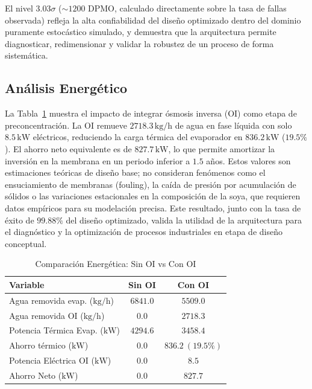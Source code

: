 \documentclass[10pt,letterpaper,twocolumn]{article}
\begin{document}
El nivel $3.03\sigma$ ($\sim1200$ DPMO, calculado directamente sobre la tasa de fallas observada) refleja la alta confiabilidad del diseño optimizado dentro del dominio puramente estocástico simulado, y demuestra que la arquitectura permite diagnosticar, redimensionar y validar la robustez de un proceso de forma sistemática.

\subsection{Análisis Energético}

La Tabla~\ref{tab:energy_comparison} muestra el impacto de integrar ósmosis inversa (OI) como etapa de preconcentración. La OI remueve $2718.3\,\text{kg/h}$ de agua en fase líquida con solo $8.5\,\text{kW}$ eléctricos, reduciendo la carga térmica del evaporador en $836.2\,\text{kW}$ ($19.5\%$). El ahorro neto equivalente es de $827.7\,\text{kW}$, lo que permite amortizar la inversión en la membrana en un periodo inferior a $1.5$ años. Estos valores son estimaciones teóricas de diseño base; no consideran fenómenos como el ensuciamiento de membranas (fouling), la caída de presión por acumulación de sólidos o las variaciones estacionales en la composición de la soya, que requieren datos empíricos para su modelación precisa. Este resultado, junto con la tasa de éxito de $99.88\%$ del dise\~no optimizado, valida la utilidad de la arquitectura para el diagn\'ostico y la optimizaci\'on de procesos industriales en etapa de diseño conceptual.

\begin{table}[t]
\centering
\caption{Comparación Energética: Sin OI vs Con OI}
\label{tab:energy_comparison}
\small
\begin{tabular}{lcc}
\toprule
Variable & Sin OI & Con OI \\
\midrule
Agua removida evap. ($\text{kg/h}$) & $6841.0$ & $5509.0$ \\
Agua removida OI ($\text{kg/h}$) & $0.0$ & $2718.3$ \\
Potencia Térmica Evap. ($\text{kW}$) & $4294.6$ & $3458.4$ \\
Ahorro térmico ($\text{kW}$) & $0.0$ & $836.2\ (19.5\%)$ \\
Potencia Eléctrica OI ($\text{kW}$) & $0.0$ & $8.5$ \\
Ahorro Neto ($\text{kW}$) & $0.0$ & $827.7$ \\
\bottomrule
\end{tabular}
\end{table}
\end{document}
